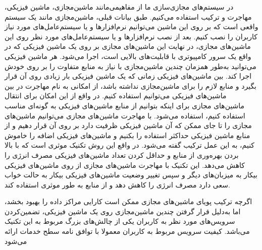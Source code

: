   در سیستم‌های مجازی‌سازی ما از مفاهیمی‌مانند ماشین‌مجازی، ماشین فیزیکی، مهاجرت و ترکیب
     استفاده می‌کنیم. طبق بیانات قبلی،  ماشین‌مجازی مانند یک سیستم واقعی است که بر روی این ماشین می‌توانیم نرم‌افزارها و یا سیستم‌عامل‌های مورد نیاز کاربران را نصب کنیم. بعد از نصب نرم‌افزارها و یا سیستم‌عامل‌های مورد نظر روی این ماشین‌های مجازی، در نهایت این ماشین‌های مجازی بر روی یک ماشین فیزیکی که در واقع یک سرور کامپیوتری با قابلیت‌های بالایی است، اجرا می‌شود. هر ماشین فیزیکی می‌توانید به‌طور همزمان چندین ماشین‌مجازی با نیاز به منابع متفاوت را بر روی خودش اجرا کند. بین ماشین‌های فیزیکی زمانی که یک ماشین فیزیکی بار زیادی روی آن قرار بگیرد و منابع لازم را برای ماشین‌مجازی نداشته باشد، از امکانی به نام مهاجرت در بین ماشین‌های فیزیکی می‌توانیم استفاده کنیم. در واقع از این امکان برای انتقال ماشین‌های مجازی برای اینکه بتوانیم از منابع ماشین‌های فیزیکی به گونه‌ای مناسب استفاده کنیم، استفاده می‌شود. با مهاجرت ماشین‌های مجازی می‌توانیم ماشین‌های مجازی را تا جای ممکن که آن ماشین فیزیکی ظرفیت دارد بر روی آن قرار دهیم و از منابع ماشین فیزیکی حداکثر استفاده را بکنیم و ماشین‌های فیزیکی اضافه را خاموش کنیم، به این عمل ترکیب گفته می‌شود. در واقع این روش تکنیک موثری است که با بالا بردن بهره‌وری از منابع و حداقل کردن تعداد ماشین‌های فیزیکی مصرف انرژی را کاهش می‌دهد. این تکنیک با مهاجرت ماشین‌های مجازی از روی ماشین‌های فیزیکی بیکار به میزبان‌های دیگر و سپس تغییر وضعیت ماشین‌های فیزیکی بیکار به حالت خواب سعی دارد مصرف انرژی را کاهش دهد و از منابع به طور موثری استفاده کند.
\cite{num5,num6,num7}
   
  
  اگرچه ترکیب پویای ماشین‌های مجازی ممکن است کارایی مراکز داده را بهبود بخشد، 
  اما به‌دلیل قرار گرفتن چندین ماشین‌مجازی روی یک ماشین فیزیکی، تضمین‌کردن سرویس‌های مورد نظر به کاربران یکی از چالش‌های بزرگ مربوط به این تکنیک می‌باشد. کیفیت سرویس مربوط به کاربران معمولا با توافق نامه سطح خدمات
    ارائه می‌شود
\cite{num7}

